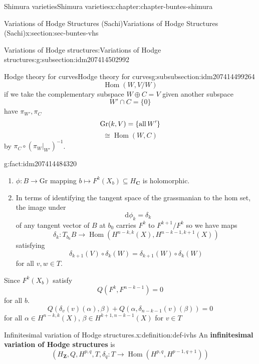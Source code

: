 \documentclass[oneside,10pt,]{book}
\newcommand{\terminology}[1]{\textbf{#1}}
\numberwithin{equation}{section}
\newcommand{\diff}{\mathop{}\!\mathrm{d}}
\newcommand{\inv}{^{-1}}
\newcommand{\ZZ}{\mathbf{Z}}
\newcommand{\CC}{\mathbf{C}}
\DeclareMathOperator{\Hom}{Hom}
\begin{document}
\begin{chapterptx}{Shimura varieties}{}{Shimura varieties}{}{}{x:chapter:chapter-buntes-shimura}
\begin{sectionptx}{Variations of Hodge Structures (Sachi)}{}{Variations of Hodge Structures (Sachi)}{}{}{x:section:sec-buntes-vhs}
\begin{subsectionptx}{Variations of Hodge structures:}{}{Variations of Hodge structures:}{}{}{g:subsection:idm207414502992}
\begin{subsubsectionptx}{Hodge theory for curves}{}{Hodge theory for curves}{}{}{g:subsubsection:idm207414499264}
\begin{equation*}
\Hom(W, V/W)
\end{equation*}
if we take the complementary subspace \(W  \oplus C = V\) given another subspace%
\begin{equation*}
W' \cap C =  \{ 0 \}
\end{equation*}
have \(\pi_{W'}, \pi_C\)%
\begin{equation*}
{\mathrm{Gr}}(k,V) = \{\text{all\,}W'\}
\end{equation*}
%
\begin{equation*}
\cong \Hom(W,C)
\end{equation*}
by \(\pi_C \circ (\pi_W|_{W'})\inv\).%
\begin{fact}{}{}{g:fact:idm207414484320}%
%
\begin{enumerate}
\item{}\(\phi\colon B\to {\mathrm{Gr}}\) mapping \(b \mapsto F^k(X_b) \subseteq H_\CC\) is holomorphic.%
\item{}In terms of identifying the tangent space of the grassmanian to the hom set, the image under%
\begin{equation*}
\diff \phi_k = \delta_k
\end{equation*}
of any tangent vector of \(B\) at \(b_0\) carries \(F^{k} \) to \(F^{k+1}/F^k\) so we have maps%
\begin{equation*}
\delta_k \colon T_{b_0} B \to \Hom(H^{n-k,k} (X), H^{n-k-1, k+1}(X))
\end{equation*}
satisfying%
\begin{equation*}
\delta_{k+1} (V) \circ \delta_k(W) =  \delta_{k+1}(W) \circ \delta_k(W)
\end{equation*}
for all \(v,w\in T\).%
\end{enumerate}
%
\end{fact}
Since \(F^k(X_b)\) satisfy%
\begin{equation*}
Q(F^k, F^{n- k - 1} ) = 0
\end{equation*}
for all \(b\).%
\begin{equation*}
Q(\delta_v(v)(\alpha), \beta) + Q(\alpha, \delta_{n-k-1}(v)(\beta)) = 0
\end{equation*}
for all \(\alpha\in H^{n-k, k}(X)\), \(\beta \in H^{k+1, n-k - 1}(X)\) for \(v \in T\)%
\begin{definition}{Infinitesimal variation of Hodge structures.}{x:definition:def-ivhs}%
An \terminology{infinitesimal variation of Hodge structures} is%
\begin{equation*}
(H_\ZZ, Q, H^{p,q}, T, \delta_q\colon T \to \Hom(H^{p,q}, H^{p-1, q+1}))

\end{equation*}
\end{definition}
\end{subsubsectionptx}
\end{subsectionptx}
\end{sectionptx}
\end{chapterptx}
\end{document}
